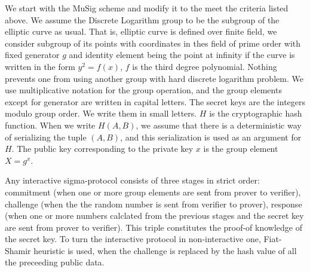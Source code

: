We start with the MuSig scheme and modify it to the meet the criteria listed above. We assume the Discrete Logarithm group to be the subgroup of the elliptic curve as usual. That is, elliptic curve is
defined over finite field, we consider subgroup of its points with coordinates in thes field of prime order with
fixed generator $g$ and identity element being the point at infinity if the curve is written in the form $y^2=f(x)$, $f$
is the third degree polynomial. Nothing prevents one from using another group with hard discrete logarithm problem. We use multiplicative notation for
the group operation, and the group elements except for generator are written in capital letters. The secret keys are the integers
modulo group order. We write them in small letters. $H$ is the cryptographic hash function. When we write $H(A,B)$, we
assume that there is a deterministic way of serializing the tuple $(A,B)$, and this serialization is used as an argument
for $H$. The public key corresponding to the private key $x$ is the group element $X=g^x$.

Any interactive sigma-protocol consists of three stages in strict order: commitment (when one or more group elements are sent from
prover to verifier), challenge (when the the random number is sent from verifier to prover), response (when one or more
numbers calclated from the previous stages and the secret key are sent from prover to verifier). This triple constitutes the proof-of knowledge of the secret key. To turn the interactive
protocol in non-interactive one, Fiat-Shamir heuristic is used, when the challenge is replaced by the hash value of all
the preceeding public data. 


